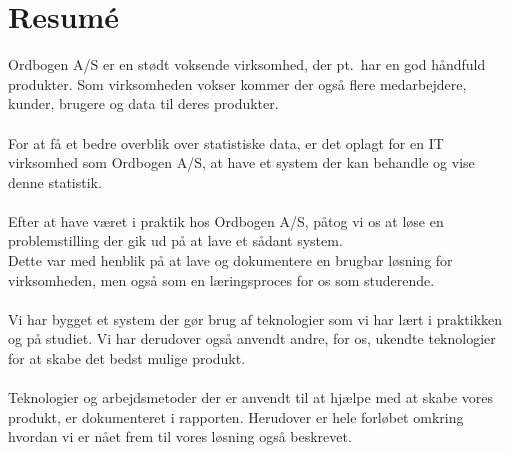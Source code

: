 \section{Resumé}
Ordbogen A/S er en stødt voksende virksomhed, der pt.\ har en god håndfuld produkter. Som virksomheden vokser kommer der også flere medarbejdere, kunder, brugere og data til deres produkter.
\\\\
For at få et bedre overblik over statistiske data, er det oplagt for en IT virksomhed som Ordbogen A/S, at have et system der kan behandle og vise denne statistik.
\\\\
Efter at have været i praktik hos Ordbogen A/S, påtog vi os at løse en problemstilling der gik ud på at lave et sådant system.
\\
Dette var med henblik på at lave og dokumentere en brugbar løsning for virksomheden, men også som en læringsproces for os som studerende.
\\\\
Vi har bygget et system der gør brug af teknologier som vi har lært i praktikken og på studiet. Vi har derudover også anvendt andre, for os, ukendte teknologier for at skabe det bedst mulige produkt.
\\\\
Teknologier og arbejdsmetoder der er anvendt til at hjælpe med at skabe vores produkt, er dokumenteret i rapporten. Herudover er hele forløbet omkring hvordan vi er nået frem til vores løsning også beskrevet.
